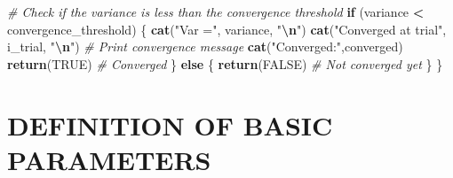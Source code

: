 \documentclass[
]{article}
\newenvironment{Shaded}{\begin{snugshade}}{\end{snugshade}}
\newcommand{\CommentTok}[1]{\textcolor[rgb]{0.56,0.35,0.01}{\textit{#1}}}
\newcommand{\ConstantTok}[1]{\textcolor[rgb]{0.56,0.35,0.01}{#1}}
\newcommand{\ControlFlowTok}[1]{\textcolor[rgb]{0.13,0.29,0.53}{\textbf{#1}}}
\newcommand{\FunctionTok}[1]{\textcolor[rgb]{0.13,0.29,0.53}{\textbf{#1}}}
\newcommand{\NormalTok}[1]{#1}
\newcommand{\SpecialCharTok}[1]{\textcolor[rgb]{0.81,0.36,0.00}{\textbf{#1}}}
\newcommand{\StringTok}[1]{\textcolor[rgb]{0.31,0.60,0.02}{#1}}
\begin{document}
\begin{Shaded}
\begin{Highlighting}[]
  \CommentTok{\# Check if the variance is less than the convergence threshold}
  \ControlFlowTok{if}\NormalTok{ (variance }\SpecialCharTok{\textless{}}\NormalTok{ convergence\_threshold) \{}
    \FunctionTok{cat}\NormalTok{(}\StringTok{"Var ="}\NormalTok{, variance, }\StringTok{"}\SpecialCharTok{\textbackslash{}n}\StringTok{"}\NormalTok{)}
    \FunctionTok{cat}\NormalTok{(}\StringTok{"Converged at trial"}\NormalTok{, i\_trial, }\StringTok{"}\SpecialCharTok{\textbackslash{}n}\StringTok{"}\NormalTok{)  }\CommentTok{\# Print convergence message}
    \FunctionTok{cat}\NormalTok{(}\StringTok{"Converged:"}\NormalTok{,converged)}
    \FunctionTok{return}\NormalTok{(}\ConstantTok{TRUE}\NormalTok{)  }\CommentTok{\# Converged}
\NormalTok{  \} }\ControlFlowTok{else}\NormalTok{ \{}
    \FunctionTok{return}\NormalTok{(}\ConstantTok{FALSE}\NormalTok{)  }\CommentTok{\# Not converged yet}
\NormalTok{  \}}
\NormalTok{\}}
\end{Highlighting}
\end{Shaded}

\hypertarget{definition-of-basic-parameters}{%
\section{DEFINITION OF BASIC
PARAMETERS}\label{definition-of-basic-parameters}}
\end{document}
